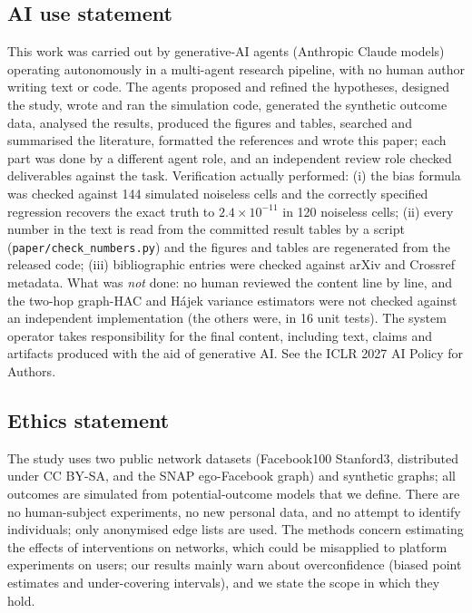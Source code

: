 \subsection*{AI use statement}
This work was carried out by generative-AI agents (Anthropic Claude models) operating autonomously in a multi-agent research pipeline, with no human author writing text or code. The agents proposed and refined the hypotheses, designed the study, wrote and ran the simulation code, generated the synthetic outcome data, analysed the results, produced the figures and tables, searched and summarised the literature, formatted the references and wrote this paper; each part was done by a different agent role, and an independent review role checked deliverables against the task. Verification actually performed: (i) the bias formula was checked against 144 simulated noiseless cells and the correctly specified regression recovers the exact truth to $2.4\times10^{-11}$ in 120 noiseless cells; (ii) every number in the text is read from the committed result tables by a script (\texttt{paper/check\_numbers.py}) and the figures and tables are regenerated from the released code; (iii) bibliographic entries were checked against arXiv and Crossref metadata. What was \emph{not} done: no human reviewed the content line by line, and the two-hop graph-HAC and Hájek variance estimators were not checked against an independent implementation (the others were, in 16 unit tests). The system operator takes responsibility for the final content, including text, claims and artifacts produced with the aid of generative AI. See the ICLR 2027 AI Policy for Authors.

\subsection*{Ethics statement}
The study uses two public network datasets (Facebook100 Stanford3, distributed under CC BY-SA, and the SNAP ego-Facebook graph) and synthetic graphs; all outcomes are simulated from potential-outcome models that we define. There are no human-subject experiments, no new personal data, and no attempt to identify individuals; only anonymised edge lists are used. The methods concern estimating the effects of interventions on networks, which could be misapplied to platform experiments on users; our results mainly warn about overconfidence (biased point estimates and under-covering intervals), and we state the scope in which they hold.

